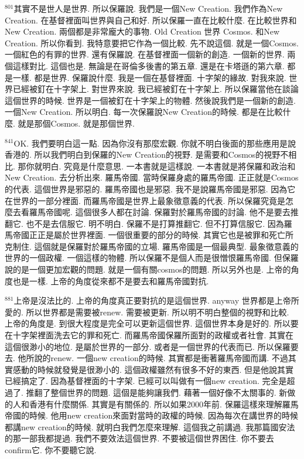 \documentclass{book}
\begin{document}
$^{801}$其實不是世人是世界.
所以保羅說.
我們是一個New Creation.
我們作為New Creation.
在基督裡面叫世界與自己和好.
所以保羅一直在比較什麼.
在比較世界和New Creation.
兩個都是非常龐大的事物.
Old Creation 世界 Cosmos.
和New Creation.
所以你看到.
我特意要把它作為一個比較.
先不說這個.
就是一個Cosmos.
一個紅色的有罪的世界.
還有保羅說.
在基督裡面一個新的創造.
一個新的世界.
兩個這樣對比.
這個也是.
無論是在哥倫多後書的第五章.
還是在卡塔遜的第六章.
都是一樣.
都是世界.
保羅說什麼.
我是一個在基督裡面.
十字架的緣故.
對我來說.
世界已經被釘在十字架上.
對世界來說.
我已經被釘在十字架上.
所以保羅當他在談論這個世界的時候.
世界是一個被釘在十字架上的物體.
然後說我們是一個新的創造.
一個New Creation.
所以明白.
每一次保羅說New Creation的時候.
都是在比較什麼.
就是那個Cosmos.
就是那個世界.

$^{841}$OK.
我們要明白這一點.
因為你沒有那麼宏觀.
你就不明白後面的那些應用是說香港的.
所以我們明白到保羅的New Creation的視野.
是需要和Cosmos的視野不相比.
那你就明白.
究竟是什麼意思.
一本書就是這樣說.
一本書就是將保羅和政治和New Creation.
去分析出來.
羅馬帝國.
當時保羅身處的羅馬帝國.
正正就是Cosmos的代表.
這個世界是邪惡的.
羅馬帝國也是邪惡.
我不是說羅馬帝國是邪惡.
因為它在世界的一部分裡面.
而羅馬帝國是世界上最象徵意義的代表.
所以保羅究竟是怎麼去看羅馬帝國呢.
這個很多人都在討論.
保羅對於羅馬帝國的討論.
他不是要去推翻它.
也不是去信服它.
明不明白.
保羅不是打算推翻它.
但不打算信服它.
因為羅馬帝國正正是屬於世界裡面.
一個很重要的部分的時候.
其實它也是被罪和死亡所克制住.
這個就是保羅對於羅馬帝國的立場.
羅馬帝國是一個最典型.
最象徵意義的世界的一個政權.
一個這樣的物體.
所以保羅不是個人而是很憎恨羅馬帝國.
但保羅說的是一個更加宏觀的問題.
就是一個有關cosmos的問題.
所以另外也是.
上帝的角度也是一樣.
上帝的角度從來都不是要去和羅馬帝國對抗.

$^{881}$上帝是沒法比的.
上帝的角度真正要對抗的是這個世界.
anyway 世界都是上帝所愛的.
所以世界都是需要被renew.
需要被更新.
所以明不明白整個的視野和比較.
上帝的角度是.
到很大程度是完全可以更新這個世界.
這個世界本身是好的.
所以要在十字架裡面洗去它的罪和死亡.
而羅馬帝國保羅所面對的政權或者社會.
其實在這個很渺小的地位.
是屬於世界的一部分.
或者是一個世界的代表而已.
所以保羅要去.
他所說的renew.
一個new creation的時候.
其實都是衝著羅馬帝國而講.
不過其實感動的時候就發覺是很渺小的.
這個政權雖然有很多不好的東西.
但是他說其實已經搞定了.
因為基督裡面的十字架.
已經可以叫做有一個new creation.
完全是超過了.
推翻了整個世界的問題.
這個是能夠讓我們.
藉著一個好像不太關事的.
新做的人和香港有什麼關係.
其實是有關係的.
所以如果2000年前.
保羅這樣來理解羅馬帝國的時候.
他用new creation來面對當時的政權的時候.
因為每次在講世界的時候都講new creation的時候.
就明白我們怎麼來理解.
這個我之前講過.
我那篇國安法的那一部我都提過.
我們不要效法這個世界.
不要被這個世界困住.
你不要去confirm它.
你不要聽它說.
\end{document}
